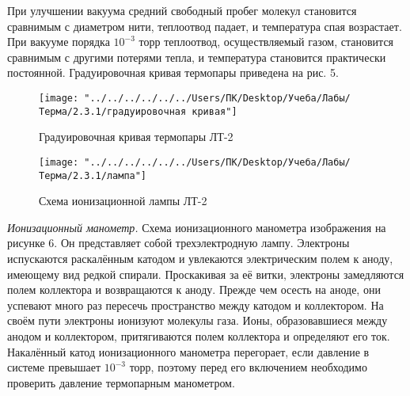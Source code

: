 \documentclass[12pt,a4paper]{article}
\begin{document}
 При улучшении вакуума средний свободный пробег молекул становится сравнимым с диаметром нити, теплоотвод падает, и температура спая возрастает. При вакууме порядка $10^{-3}$ торр теплоотвод, осуществляемый газом, становится сравнимым с другими потерями тепла, и температура становится практически постоянной. Градуировочная кривая термопары приведена на рис. 5. \\
 \begin{figure}[!h]
 	\centering
 	\texttt{[image: "../../../../../../Users/ПК/Desktop/Учеба/Лабы/Терма/2.3.1/градуировочная кривая"]}
 	\caption[]{Градуировочная кривая термопары ЛТ-2}
 	\label{fig:Градуировочная кривая}
 \end{figure}
\newpage
 \begin{wrapfigure}{r}{60mm} %
	\begin{center}
		\texttt{[image: "../../../../../../Users/ПК/Desktop/Учеба/Лабы/Терма/2.3.1/лампа"]}
		\caption{Схема ионизационной лампы ЛТ-2}
		\label{fig:лампа}
	\end{center}
\end{wrapfigure}
\textit{Ионизационный манометр.} Схема ионизационного манометра изображения на рисунке 6. Он представляет собой трехэлектродную лампу. Электроны испускаются раскалённым катодом и увлекаются электрическим полем к аноду, имеющему вид редкой спирали. Проскакивая за её витки, электроны замедляются полем коллектора и возвращаются к аноду. Прежде чем осесть на аноде, они успевают много раз пересечь пространство между катодом и коллектором. На своём пути электроны ионизуют молекулы газа. Ионы, образовавшиеся между анодом и коллектором, притягиваются полем коллектора и определяют его ток. \\
  Накалённый катод ионизационного манометра перегорает, если давление в системе превышает $10^{-3}$ торр, поэтому перед его включением необходимо проверить давление термопарным манометром. \\
\end{document}
